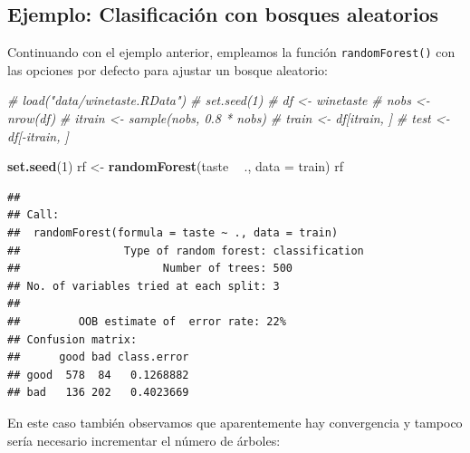 \documentclass[
  spanish,
]{book}
\newenvironment{Shaded}{\begin{snugshade}}{\end{snugshade}}
\newcommand{\CommentTok}[1]{\textcolor[rgb]{0.56,0.35,0.01}{\textit{#1}}}
\newcommand{\DataTypeTok}[1]{\textcolor[rgb]{0.13,0.29,0.53}{#1}}
\newcommand{\DecValTok}[1]{\textcolor[rgb]{0.00,0.00,0.81}{#1}}
\newcommand{\KeywordTok}[1]{\textcolor[rgb]{0.13,0.29,0.53}{\textbf{#1}}}
\newcommand{\NormalTok}[1]{#1}
\newcommand{\OperatorTok}[1]{\textcolor[rgb]{0.81,0.36,0.00}{\textbf{#1}}}
\newcommand{\StringTok}[1]{\textcolor[rgb]{0.31,0.60,0.02}{#1}}
\theoremstyle{break}
\theoremstyle{definition}
\theoremstyle{definition}
\theoremstyle{definition}
\theoremstyle{remark}
\begin{document}
\hypertarget{ejemplo-clasif-rf}{%
\subsection{Ejemplo: Clasificación con bosques aleatorios}\label{ejemplo-clasif-rf}}

Continuando con el ejemplo anterior, empleamos la función \texttt{randomForest()} con las opciones por defecto para ajustar un bosque aleatorio:

\begin{Shaded}
\begin{Highlighting}[]
\CommentTok{# load("data/winetaste.RData")}
\CommentTok{# set.seed(1)}
\CommentTok{# df <- winetaste}
\CommentTok{# nobs <- nrow(df)}
\CommentTok{# itrain <- sample(nobs, 0.8 * nobs)}
\CommentTok{# train <- df[itrain, ]}
\CommentTok{# test <- df[-itrain, ]}

\KeywordTok{set.seed}\NormalTok{(}\DecValTok{1}\NormalTok{)}
\NormalTok{rf <-}\StringTok{ }\KeywordTok{randomForest}\NormalTok{(taste }\OperatorTok{~}\StringTok{ }\NormalTok{., }\DataTypeTok{data =}\NormalTok{ train)}
\NormalTok{rf}
\end{Highlighting}
\end{Shaded}

\begin{verbatim}
## 
## Call:
##  randomForest(formula = taste ~ ., data = train) 
##                Type of random forest: classification
##                      Number of trees: 500
## No. of variables tried at each split: 3
## 
##         OOB estimate of  error rate: 22%
## Confusion matrix:
##      good bad class.error
## good  578  84   0.1268882
## bad   136 202   0.4023669
\end{verbatim}

En este caso también observamos que aparentemente hay convergencia y tampoco sería necesario incrementar el número de árboles:

\begin{Shaded}
\end{Shaded}
\end{document}
